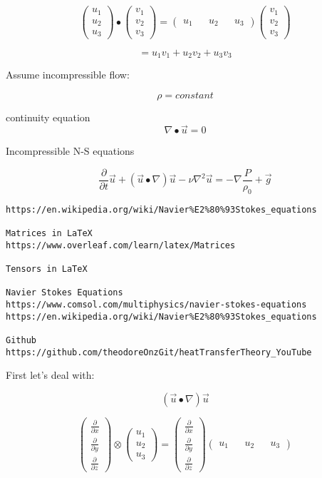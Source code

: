\documentclass[11pt]{article}
\begin{document}
$$ \begin{pmatrix}
u_1 \\
u_2 \\
u_3 
\end{pmatrix} \bullet \begin{pmatrix}
v_1 \\
v_2 \\
v_3 
\end{pmatrix}
=
\begin{pmatrix}
u_1 && u_2 && u_3
\end{pmatrix} \begin{pmatrix}
v_1 \\
v_2 \\
v_3 
\end{pmatrix} $$

$$= u_1 v_1 + u_2 v_2 + u_3 v_3 $$

Assume incompressible flow:

$$\rho=constant$$

continuity equation
$$\nabla \bullet \vec{u}=0$$


Incompressible N-S equations

$$\frac{\partial }{\partial t}\vec{u} +(\vec{u}\bullet \nabla) \vec{u} - \nu \nabla^2 \vec{u} = - \nabla \frac{P}{\rho_0} +\vec{g}$$

\begin{verbatim}
https://en.wikipedia.org/wiki/Navier%E2%80%93Stokes_equations

Matrices in LaTeX
https://www.overleaf.com/learn/latex/Matrices

Tensors in LaTeX

Navier Stokes Equations
https://www.comsol.com/multiphysics/navier-stokes-equations
https://en.wikipedia.org/wiki/Navier%E2%80%93Stokes_equations

Github
https://github.com/theodoreOnzGit/heatTransferTheory_YouTube
\end{verbatim}

First let's deal with:

$$(\vec{u}\bullet \nabla) \vec{u}$$

\begin{equation}
\begin{pmatrix}
\frac{\partial}{\partial x} \\ 
\frac{\partial}{\partial y} \\
\frac{\partial}{\partial z} 
\end{pmatrix} \otimes  \begin{pmatrix}
u_1 \\
u_2 \\
u_3
\end{pmatrix} 
= 
\begin{pmatrix}
\frac{\partial}{\partial x} \\ 
\frac{\partial}{\partial y} \\
\frac{\partial}{\partial z} 
\end{pmatrix}  \begin{pmatrix}
u_1 && u_2 && u_3
\end{pmatrix} 
\end{equation}
\end{document}
